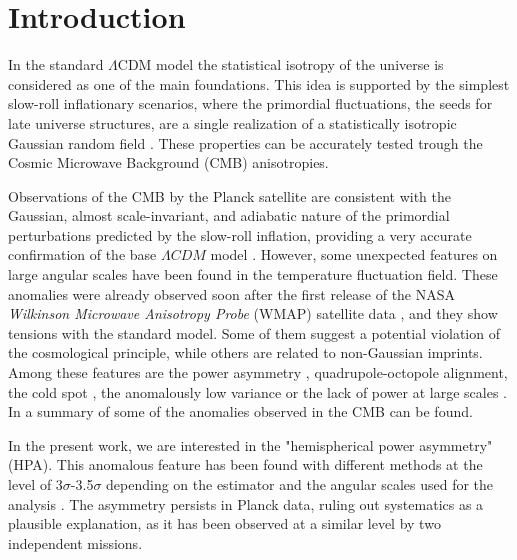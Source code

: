 \section{Introduction}

In the standard $\Lambda$CDM model the statistical isotropy of the universe is considered as one of the main foundations. This idea is supported by the simplest slow-roll inflationary scenarios, where the primordial fluctuations, the seeds for late universe structures, are a single realization of a statistically isotropic Gaussian random field \cite{2020A&A...641A..10P}. These properties can be accurately tested trough the Cosmic Microwave Background (CMB) anisotropies.

Observations of the CMB by the Planck satellite are consistent with the Gaussian, almost scale-invariant, and adiabatic nature of the primordial perturbations predicted by the slow-roll inflation, providing a very accurate confirmation of the base $\Lambda CDM$ model \cite{Planck:2018nkj, 2020A&A...641A...5P, 2020A&A...641A...6P, Planck:2019evm}. However, some unexpected features on large angular scales have been found in the temperature fluctuation field. These anomalies were already observed soon after the first release of the NASA \textit{Wilkinson Microwave Anisotropy Probe} (WMAP) satellite data \cite{2003ApJS..148....1B, 2007ApJS..170..288H, 2009ApJS..180..225H, 2011ApJS..192...17B, 2013ApJS..208...19H}, and they show tensions with the standard model. Some of them suggest a potential violation of the cosmological principle, while others are related to non-Gaussian imprints. Among these features are the power asymmetry \cite{2004ApJ...605...14E, 2004MNRAS.354..641H}, quadrupole-octopole alignment\cite{2004PhRvD..69f3516D}, the cold spot \cite{2004ApJ...609...22V, 2010AdAst2010E..77V}, the anomalously low variance \citep{Monteserin08} or the lack of power at large scales \cite{2006A&A...454..409B}. In \cite{2023CQGra..40i4001K} a summary of some of the anomalies observed in the CMB can be found.


In the present work, we are interested in the "hemispherical power asymmetry" (HPA). This anomalous feature has been found with different methods at the level of 3$\sigma$-3.5$\sigma$ depending on the estimator and the angular scales used for the analysis \cite{2007ApJ...660L..81E, 2009ApJ...704.1448H, 2009ApJ...699..985H, 2014A&A...571A..23P, Akrami:2014eta, 2015MNRAS.446.4232A, 2016A&A...594A..16P, Planck:2019evm}. The asymmetry persists in Planck data, ruling out systematics as a plausible explanation, as it has been observed at a similar level by two independent missions.

